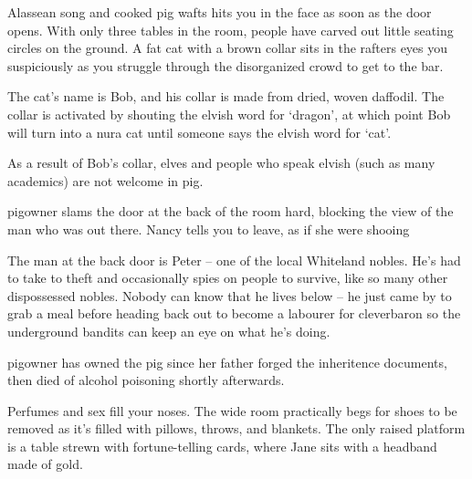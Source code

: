 
\begin{boxtext}
	Alassean song and cooked pig wafts hits you in the face as soon as the door opens.  With only three tables in the room, people have carved out little seating circles on the ground.  A fat cat with a brown collar sits in the rafters eyes you suspiciously as you struggle through the disorganized crowd to get to the bar.

\end{boxtext}

The cat's name is Bob, and his collar is made from dried, woven daffodil.  The collar is activated by shouting the elvish word for `dragon', at which point Bob will turn into a nura cat until someone says the elvish word for `cat'.

As a result of Bob's collar, elves and people who speak elvish (such as many academics) are not welcome in \gls{pig}.


\nuracat


\begin{boxtext}
	\Gls{pigowner} slams the door at the back of the room hard, blocking the view of the man who was out there.  Nancy tells you to leave, as if she were shooing 
\end{boxtext}

The man at the back door is Peter -- one of the local Whiteland nobles. He's had to take to theft and occasionally spies on people to survive, like so many other dispossessed nobles.  Nobody can know that he lives below -- he just came by to grab a meal before heading back out to become a labourer for \gls{cleverbaron} so the underground bandits can keep an eye on what he's doing.


\Gls{pigowner} has owned the pig since her father forged the inheritence documents, then died of alcohol poisoning shortly afterwards.




\begin{boxtext}
	Perfumes and sex fill your noses.  The wide room practically begs for shoes to be removed as it's filled with pillows, throws, and blankets.  The only raised platform is a table strewn with fortune-telling cards, where Jane sits with a headband made of gold.
\end{boxtext}

